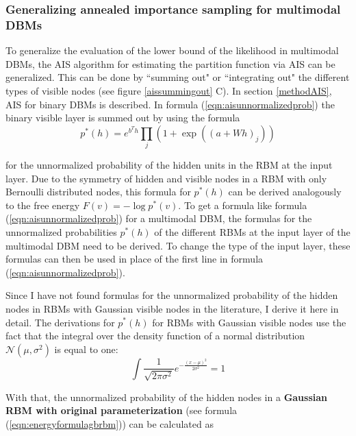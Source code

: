 \documentclass[12pt]{article}
\begin{document}
\subsubsection{Generalizing annealed importance sampling for multimodal DBMs} \label{unnormalizedprobsrbm}

To generalize the evaluation of the lower bound of the likelihood in multimodal DBMs, the AIS algorithm for estimating the partition function via AIS can be generalized.
This can be done by ``summing out" or ``integrating out" the different types of visible nodes (see figure \ref{aissummingout} C).
In section \ref{methodAIS}, AIS for binary DBMs is described.
In formula (\ref{eqn:aisunnormalizedprob}) the binary visible layer is summed out by using the formula 
\[
p^*(h) = e^{b^T h} \prod_j (1+ \exp((a + W h)_j))
\]

for the unnormalized probability of the hidden units in the RBM at the input layer.
Due to the symmetry of hidden and visible nodes in a RBM with only Bernoulli distributed nodes, this formula for $p^*(h)$ can be derived analogously to the free energy $F(v) = - \log p^*(v)$. 
To get a formula like formula (\ref{eqn:aisunnormalizedprob}) for a multimodal DBM, the formulas for the unnormalized probabilities $p^*(h)$ of the different RBMs at the input layer of the multimodal DBM need to be derived.
To change the type of the input layer, these formulas can then be used in place of the first line in formula (\ref{eqn:aisunnormalizedprob}).


Since I have not found formulas for the unnormalized probability of the hidden nodes in RBMs with Gaussian visible nodes in the literature, I derive it here in detail.
The derivations for $p^*(h)$ for RBMs with Gaussian visible nodes use the fact that the integral over the density function of a normal distribution $\mathcal{N}(\mu, \sigma^2)$ is equal to one:
\begin{equation} \int \frac{1}{\sqrt{2 \pi \sigma^2}} e^{ -\frac{(x - \mu)^2}{2 \sigma^2}} = 1  
\label{eqn:densitynormal}
\end{equation}

With that, the unnormalized probability of the hidden nodes in a {\bf Gaussian RBM with original parameterization} (see formula (\ref{eqn:energyformulagbrbm})) can be calculated as
\end{document}

